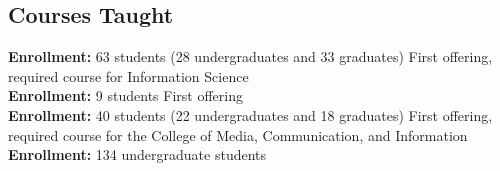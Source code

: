\documentclass[10pt,letterpaper,final]{moderncv}
\begin{document}
\subsection{Courses Taught}
{\small {\textcolor{color5}{\textbf{Enrollment:}}} 63 students (28 undergraduates and 33 graduates)}\vspace{6pt}
{\small First offering, required course for Information Science\\ {\textcolor{color5}{\textbf{Enrollment:}}} 9 students\vspace{6pt}}
{\small First offering\\ {\textcolor{color5}{\textbf{Enrollment:}}} 40 students (22 undergraduates and 18 graduates)}\vspace{6pt}
{First offering, required course for the College of Media, Communication, and Information\\{\textcolor{color5}{\textbf{Enrollment:}}} 134 undergraduate students }\vspace{6pt}
\end{document}
